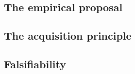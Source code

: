 
\subsection{The empirical proposal}    
\subsection{The acquisition principle} 
\subsection{Falsifiability}            
